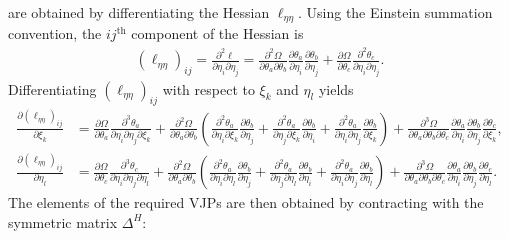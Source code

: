 \documentclass{article}
\begin{document}
are obtained by differentiating the Hessian $\ell_{\eta\eta}$.
Using the Einstein summation convention, the $ij^\text{th}$ component of the Hessian is
%
\begin{align}
  (\ell_{\eta\eta})_{ij}
  = \frac{\partial^2 \ell}{\partial \eta_i \partial \eta_j}
  = \frac{\partial^2 \Omega}{\partial \theta_a \partial \theta_b} \frac{\partial \theta_a}{\partial \eta_i} \frac{\partial \theta_b}{\partial \eta_j}
  + \frac{\partial \Omega}{\partial \theta_c} \frac{\partial^2 \theta_c}{\partial \eta_i \partial \eta_j}.
\end{align}
%
Differentiating $(\ell_{\eta\eta})_{ij}$ with respect to $\xi_k$ and $\eta_l$ yields
%
\begin{align}
  \tfrac{\partial (\ell_{\eta\eta})_{ij}}{\partial \xi_k}  & = \tfrac{\partial \Omega}{\partial \theta_a} \tfrac{\partial^3 \theta_a}{\partial \eta_i \partial \eta_j \partial \xi_k} + \tfrac{\partial^2 \Omega}{\partial \theta_a \partial \theta_b} \left( \tfrac{\partial^2 \theta_a}{\partial \eta_i \partial \xi_k} \tfrac{\partial \theta_b}{\partial \eta_j} + \tfrac{\partial^2 \theta_a}{\partial \eta_j \partial \xi_k} \tfrac{\partial \theta_b}{\partial \eta_i} + \tfrac{\partial^2 \theta_a}{\partial \eta_i \partial \eta_j} \tfrac{\partial \theta_b}{\partial \xi_k} \right) + \tfrac{\partial^3 \Omega}{\partial \theta_a \partial \theta_b \partial \theta_c} \tfrac{\partial \theta_a}{\partial \eta_i} \tfrac{\partial \theta_b}{\partial \eta_j} \tfrac{\partial \theta_c}{\partial \xi_k}, \label{eq:third-derivative-ell-eta-eta-xi}       \\
  \tfrac{\partial (\ell_{\eta\eta})_{ij}}{\partial \eta_l} & = \tfrac{\partial \Omega}{\partial \theta_c} \tfrac{\partial^3 \theta_c}{\partial \eta_i \partial \eta_j \partial \eta_l} + \tfrac{\partial^2 \Omega}{\partial \theta_a \partial \theta_b} \left( \tfrac{\partial^2 \theta_a}{\partial \eta_i \partial \eta_l} \tfrac{\partial \theta_b}{\partial \eta_j} + \tfrac{\partial^2 \theta_a}{\partial \eta_j \partial \eta_l} \tfrac{\partial \theta_b}{\partial \eta_i} + \tfrac{\partial^2 \theta_a}{\partial \eta_i \partial \eta_j} \tfrac{\partial \theta_b}{\partial \eta_l} \right) + \tfrac{\partial^3 \Omega}{\partial \theta_a \partial \theta_b \partial \theta_c} \tfrac{\partial \theta_a}{\partial \eta_i} \tfrac{\partial \theta_b}{\partial \eta_j} \tfrac{\partial \theta_c}{\partial \eta_l}. \label{eq:third-derivative-ell-eta-eta-eta}
\end{align}
%
The elements of the required VJPs are then obtained by contracting with the symmetric matrix $\Delta^H$:
\end{document}

